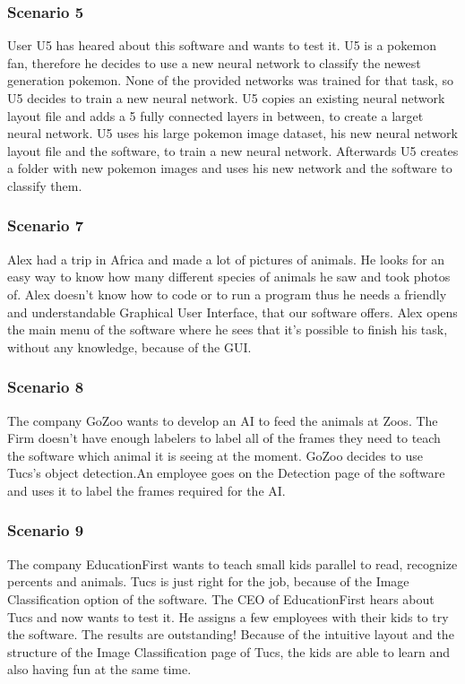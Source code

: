 \documentclass[parskip=full]{scrartcl}
\begin{document}
\subsubsection{Scenario 5}
User U5 has heared about this software and wants to test it.
U5 is a pokemon fan, therefore he decides to use a new neural network to classify the newest generation pokemon. None of the provided networks was trained for that task, so U5 decides to train a new neural network. U5 copies an existing neural network layout file and adds a 5 fully connected layers in between, to create a larget neural network. U5 uses his large pokemon image dataset, his new neural network layout file and the software, to train a new neural network. 
Afterwards U5 creates a folder with new pokemon images and uses his new network and the software to classify them.
\subsubsection{Scenario 7}
Alex had a trip in Africa and made a lot of pictures of animals. He looks for an easy way to know how many different species of animals he saw and took photos of. Alex doesn't know how to code or to run a program thus he needs a friendly and understandable Graphical User Interface, that our software offers. Alex opens the main menu of the software where he sees that it's possible to finish his task, without any knowledge, because of the GUI. 
\subsubsection{Scenario 8}
The company GoZoo wants to develop an AI to feed the animals at Zoos. The Firm doesn't have enough labelers to label all of the frames they need to teach the software which animal it is seeing at the moment. GoZoo decides to use Tucs's object detection.An employee goes on the Detection page of the software and uses it to label the frames required for the AI.
\clearpage
\subsubsection{Scenario 9}
The company EducationFirst wants to teach small kids parallel to read, recognize percents and animals. Tucs is just right for the job, because of the Image Classification option of the software. The CEO of EducationFirst hears about Tucs and now wants to test it. He assigns a few employees with their kids to try the software. The results are outstanding! Because of the intuitive layout and the structure of the Image Classification page of Tucs, the kids are able to learn and also having fun at the same time.
\clearpage
\end{document}

